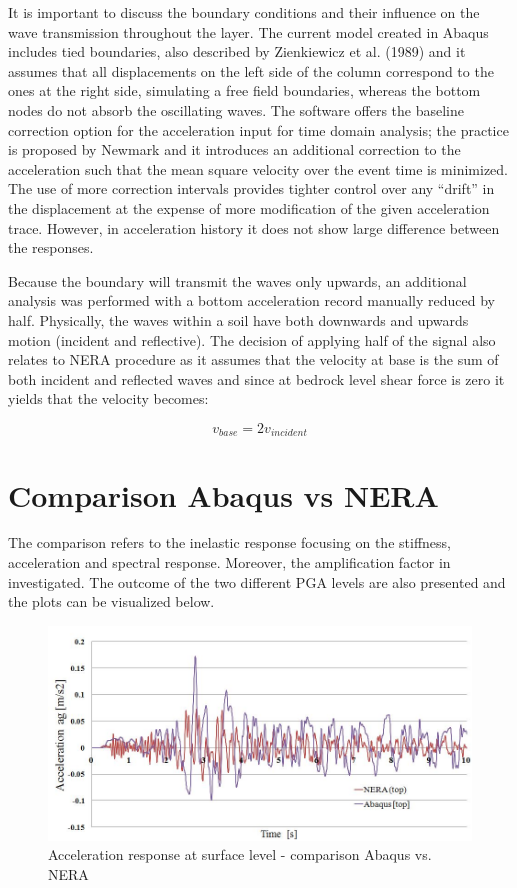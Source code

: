 	It is important to discuss the boundary conditions and their influence on the wave transmission throughout the layer. The current model created in Abaqus includes tied boundaries, also described by Zienkiewicz et al. (1989) \cite{zienkiewicz1989earthquake} and it assumes that all displacements on the left side of the column correspond to the ones at the right side, simulating a free field boundaries, whereas the bottom nodes do not absorb the oscillating waves. The software offers the baseline correction option for the acceleration input for time domain analysis; the practice is proposed by Newmark \cite{newmark1959method} and it introduces an additional correction to the acceleration such that the mean square velocity over the event time is minimized. The use of more correction intervals provides tighter control over any “drift” in the displacement at the expense of more modification of the given acceleration trace. However, in acceleration history it does not show large difference between the responses.
	
	Because the boundary will transmit the waves only upwards, an additional analysis was performed with a bottom acceleration record manually reduced by half. Physically, the waves within a soil have both downwards and upwards motion (incident and reflective). The decision of applying half of the signal also relates to NERA procedure as it assumes that the velocity at base is the sum of both incident and reflected waves and since at bedrock level shear force is zero it yields that the velocity becomes:
	
	\begin{equation}
	v_{base}=2v_{incident}
	\end{equation} 
	
	\section{Comparison Abaqus vs NERA}
	The comparison refers to the inelastic response focusing on the stiffness, acceleration and spectral response. Moreover, the amplification factor in investigated. The outcome of the two different PGA levels are also presented and the plots can be visualized below. 
	
	\begin{figure}[h!]
		\centering
		\includegraphics[width=0.7\linewidth]{"acc_comp1"}
		\caption{Acceleration response at surface level - comparison Abaqus vs. NERA}
		\label{comp1}
	\end{figure}
	
